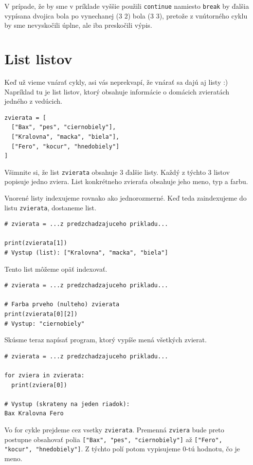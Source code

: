 \documentclass{article}
\begin{document}
V prípade, že by sme v príklade vyššie použili \texttt{continue} namiesto \texttt{break} by ďalšia vypísana dvojica bola po vynechanej ($3$ $2$) bola
($3$ $3$), pretože z vnútorného cyklu by sme nevyskočili úplne, ale iba preskočili výpis.

\section{List listov}
Keď už vieme vnárať cykly, asi vás neprekvapí, že vnárať sa dajú aj listy :)
Napríklad tu je list listov, ktorý obsahuje informácie o domácich zvieratách jedného z vedúcich.
\begin{lstlisting}
zvierata = [
  ["Bax", "pes", "ciernobiely"],
  ["Kralovna", "macka", "biela"],
  ["Fero", "kocur", "hnedobiely"]
]
\end{lstlisting}
Všimnite si, že list \texttt{zvierata} obsahuje $3$ ďalšie listy. Každý z týchto $3$ listov popisuje jedno zviera. List konkrétneho zvieraťa obsahuje jeho meno, typ a farbu.

Vnorené listy indexujeme rovnako ako jednorozmerné. Keď teda zaindexujeme do listu \texttt{zvierata}, dostaneme list.
\begin{lstlisting}
# zvierata = ...z predzchadzajuceho prikladu...

print(zvierata[1])
# Vystup (list): ["Kralovna", "macka", "biela"]
\end{lstlisting}
Tento list môžeme opäť indexovať.
\begin{lstlisting}
# zvierata = ...z predzchadzajuceho prikladu...

# Farba prveho (nulteho) zvierata
print(zvierata[0][2])
# Vystup: "ciernobiely"
\end{lstlisting}
Skúsme teraz napísať program, ktorý vypíše mená všetkých zvierat.
\begin{lstlisting}
# zvierata = ...z predzchadzajuceho prikladu...

for zviera in zvierata:
  print(zviera[0])

# Vystup (skrateny na jeden riadok):
Bax Kralovna Fero
\end{lstlisting}
Vo for cykle prejdeme cez vsetky \texttt{zvierata}. Premenná \texttt{zviera} bude preto postupne obsahovať polia \texttt{["Bax", "pes", "ciernobiely"]} až
\texttt{["Fero", "kocur", "hnedobiely"]}. Z týchto polí potom vypisujeme $0$-tú hodnotu, čo je meno.
\end{document}
